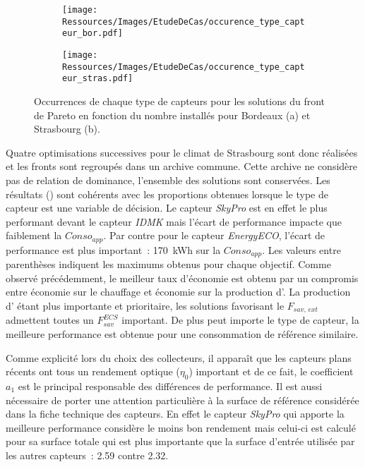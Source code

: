 \begin{figure}
    \centering
    \begin{subfigure}[b]{0.45\textwidth}
        \centering
        \texttt{[image: Ressources/Images/EtudeDeCas/occurence\_type\_capteur\_bor.pdf]}
        \caption{}
        \label{fig:occurence_type_capteur_bor}
    \end{subfigure}
    \quad
    \begin{subfigure}[b]{0.45\textwidth}
        \centering
        \texttt{[image: Ressources/Images/EtudeDeCas/occurence\_type\_capteur\_stras.pdf]}
        \caption{}
        \label{fig:occurence_type_capteur_stras}
    \end{subfigure}
    \caption[Occurrences de chaque type de capteurs pour les solutions du front de Pareto]
             {Occurrences de chaque type de capteurs pour les solutions du front de Pareto
              en fonction du nombre installés pour Bordeaux (a) et Strasbourg (b).}
    \label{fig:occurence_type_capteur}
\end{figure}

Quatre optimisations successives pour le climat de Strasbourg sont donc réalisées
et les fronts sont regroupés dans un archive commune.
Cette archive ne considère pas de relation de dominance, l’ensemble des solutions sont
conservées. Les résultats () sont cohérents avec les
proportions obtenues lorsque le type de capteur est une variable de décision. Le capteur
\textit{SkyPro} est en effet le plus performant devant le capteur \textit{IDMK} mais
l’écart de performance impacte que faiblement la $Conso_{app}$. Par contre pour le capteur \textit{EnergyECO},
l’écart de performance est plus important~: \SI{170}{kWh} sur la $Conso_{app}$.
Les valeurs entre parenthèses indiquent les maximums obtenus pour chaque objectif.
Comme observé précédemment, le meilleur taux d’économie est obtenu par un compromis
entre économie sur le chauffage et économie sur la production d’. La production d’ étant
plus importante et prioritaire, les solutions favorisant le $F_{sav,\, ext}$ admettent toutes
un $F_{sav}^{ECS}$ important. De plus peut importe le type de capteur, la
meilleure performance est obtenue pour une consommation de référence similaire.

Comme explicité lors du choix des collecteurs, il apparaît que les capteurs plans récents
ont tous un rendement optique ($\eta_{0}$) important et de ce fait, le coefficient $a_{1}$ est
le principal responsable des différences de performance. Il est aussi nécessaire
de porter une attention particulière à la surface de référence considérée dans la
fiche technique des capteurs. En effet le capteur \textit{SkyPro} qui apporte la
meilleure performance considère le moins bon rendement mais celui-ci est calculé
pour sa surface totale qui est plus importante que la surface d’entrée utilisée
par les autres capteurs~: \num{2.59} contre \num{2.32}.

